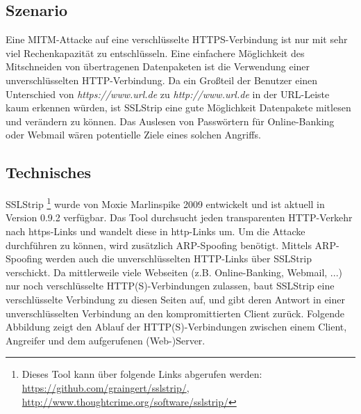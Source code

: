 \subsection*{Szenario}
Eine MITM-Attacke auf eine verschlüsselte HTTPS-Verbindung ist nur mit sehr viel Rechenkapazität zu entschlüsseln. Eine einfachere Möglichkeit des Mitschneiden von übertragenen Datenpaketen ist die Verwendung einer unverschlüsselten HTTP-Verbindung. Da ein Großteil der Benutzer einen Unterschied von \textit{https://www.url.de} zu \textit{http://www.url.de} in der URL-Leiste kaum erkennen würden, ist SSLStrip eine gute Möglichkeit Datenpakete mitlesen und verändern zu können. \newline
Das Auslesen von Passwörtern für Online-Banking oder Webmail wären potentielle Ziele eines solchen Angriffs.

\subsection*{Technisches}
SSLStrip \footnote{ Dieses Tool kann über folgende Links abgerufen werden: \url{https://github.com/graingert/sslstrip/}, \url{http://www.thoughtcrime.org/software/sslstrip/}} wurde von Moxie Marlinspike 2009 entwickelt und ist aktuell in Version 0.9.2 verfügbar. Das Tool durchsucht jeden transparenten HTTP-Verkehr nach https-Links und wandelt diese in http-Links um. Um die Attacke durchführen zu können, wird zusätzlich ARP-Spoofing benötigt. Mittels ARP-Spoofing werden auch die unverschlüsselten HTTP-Links über SSLStrip verschickt. Da mittlerweile viele Webseiten (z.B. Online-Banking, Webmail, ...) nur noch verschlüsselte HTTP(S)-Verbindungen zulassen, baut SSLStrip eine verschlüsselte Verbindung zu diesen Seiten auf, und gibt deren Antwort in einer unverschlüsselten Verbindung an den kompromittierten Client zurück. Folgende Abbildung zeigt den Ablauf der HTTP(S)-Verbindungen zwischen einem Client, Angreifer und dem aufgerufenen (Web-)Server. \newpage

